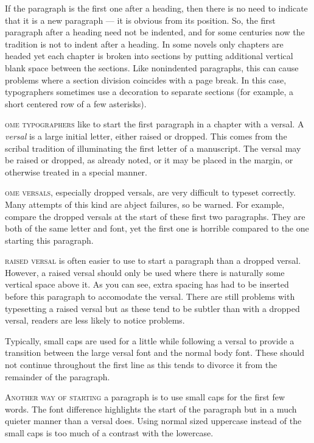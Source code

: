 \documentclass[10pt,a4paper,oneside,extrafontsizes]{memoir}%
\begin{document}
\begin{paracol}{2}
    If the paragraph is the first one after a heading, 
then there
is no need to indicate that it is a new paragraph --- it is obvious from its
position. So, the first paragraph after a heading 
need not be indented, and for some centuries now 
the tradition is not to indent after a heading.
In some novels only chapters are headed yet each chapter is broken into
sections by putting additional vertical blank space between the sections.
Like nonindented paragraphs, 
this can cause problems where a section division
coincides with a page break. In this case, typographers sometimes use a
decoration to separate sections (for example, a short centered row of a few
asterisks).
\end{paracol}   


\begin{paracol}{2}
\switchEng
{}\textsc{ome typographers} 
like to start the first paragraph in a chapter
with a versal. A \emph{versal} is a large initial letter, either raised or
dropped. This comes from the scribal tradition of illuminating the first
letter of a manuscript. The versal may be raised or dropped, as already noted,
or it may be placed in the margin, or otherwise treated in 
a special manner.

\textsc{ome versals,} especially dropped versals, are very difficult
to typeset correctly. Many attempts of this kind are abject failures, so
be warned. For example, compare the dropped versals at the start of these
first two paragraphs. They are both of the same letter and font, yet the first
one is horrible compared to the one starting this paragraph.


 \textsc{raised versal} is often easier to use to 
start a paragraph than a dropped versal. 
However, a raised versal should only be used
where there is naturally some vertical space above it. As you can see, extra
spacing has had to be inserted before this paragraph to accomodate the versal.
There are still problems with typesetting a raised versal but as these tend
to be subtler than with a dropped versal, readers are less likely
to notice problems.

Typically, small caps are used for a little while following a versal to 
provide a transition between the large versal font and the normal body font.
These should not continue throughout the first line as this tends to divorce
it from the remainder of the paragraph. 

\noindent \textsc{Another way of starting} a paragraph is to use small
caps for the first few words. The font difference highlights the start
of the paragraph but in a much quieter manner than a versal does. Using
normal sized uppercase instead of the small caps is too much of a 
contrast with the lowercase.
\end{paracol}
\end{document}

